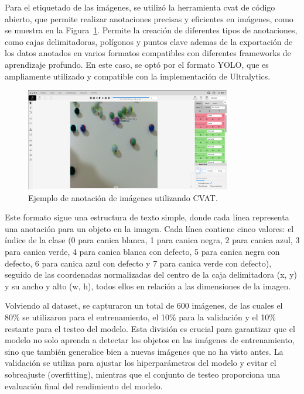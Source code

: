 \documentclass[11pt,spanish,listoffigures,listoftables]{tfgetsinf}
\begin{document}
Para el etiquetado de las imágenes, se utilizó la herramienta \gls{cvat}\cite{CVAT_ai_Corporation_Computer_Vision_Annotation_2023} de código abierto, que permite realizar anotaciones precisas y eficientes en imágenes, como se muestra en la Figura~\ref{fig:cvat_anotacion}. Permite la creación de diferentes tipos de anotaciones, como cajas delimitadoras, polígonos y puntos clave ademas de la exportación de los datos anotados en varios formatos compatibles con diferentes frameworks de aprendizaje profundo. En este caso, se optó por el formato YOLO, que es ampliamente utilizado y compatible con la implementación de Ultralytics.

\begin{figure}[H]
   \centering
   \includegraphics[width=0.8\textwidth]{images/diseno_e_implementacion/ejemplo_CVAT.png}
   \caption[Ejemplo de anotación de imágenes utilizando CVAT]{Ejemplo de anotación de imágenes utilizando CVAT.}
   \label{fig:cvat_anotacion}
\end{figure}


Este formato sigue una estructura de texto simple, donde cada línea representa una anotación para un objeto en la imagen. Cada línea contiene cinco valores: el índice de la clase (0 para canica blanca, 1 para canica negra, 2 para canica azul, 3 para canica verde, 4 para canica blanca con defecto, 5 para canica negra con defecto, 6 para canica azul con defecto y 7 para canica verde con defecto), seguido de las coordenadas normalizadas del centro de la caja delimitadora (x, y) y su ancho y alto (w, h), todos ellos en relación a las dimensiones de la imagen.

Volviendo al dataset, se capturaron un total de 600 imágenes, de las cuales el 80\% se utilizaron para el entrenamiento, el 10\% para la validación y el 10\% restante para el testeo del modelo. Esta división es crucial para garantizar que el modelo no solo aprenda a detectar los objetos en las imágenes de entrenamiento, sino que también generalice bien a nuevas imágenes que no ha visto antes. La validación se utiliza para ajustar los hiperparámetros del modelo y evitar el sobreajuste (overfitting), mientras que el conjunto de testeo proporciona una evaluación final del rendimiento del modelo.
\end{document}
